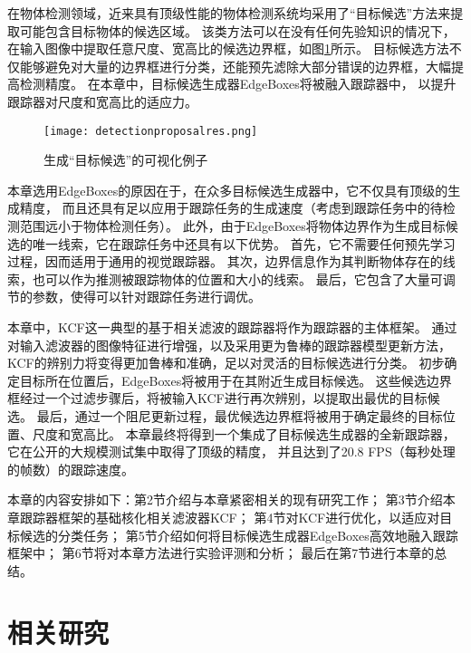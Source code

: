 在物体检测领域，近来具有顶级性能的物体检测系统均采用了``目标候选''方法来提取可能包含目标物体的候选区域。
该类方法可以在没有任何先验知识的情况下，在输入图像中提取任意尺度、宽高比的候选边界框，如图\ref{detectionproposalres}所示。
目标候选方法不仅能够避免对大量的边界框进行分类，还能预先滤除大部分错误的边界框，大幅提高检测精度。
在本章中，目标候选生成器EdgeBoxes将被融入跟踪器中，
以提升跟踪器对尺度和宽高比的适应力。

\begin{figure}[htb]
\centering
\texttt{[image: detectionproposalres.png]}
\caption{生成``目标候选''的可视化例子}
\label{detectionproposalres}
\end{figure}

本章选用EdgeBoxes的原因在于，在众多目标候选生成器中，它不仅具有顶级的生成精度，
而且还具有足以应用于跟踪任务的生成速度（考虑到跟踪任务中的待检测范围远小于物体检测任务）。
此外，由于EdgeBoxes将物体边界作为生成目标候选的唯一线索，它在跟踪任务中还具有以下优势。
首先，它不需要任何预先学习过程，因而适用于通用的视觉跟踪器。
其次，边界信息作为其判断物体存在的线索，也可以作为推测被跟踪物体的位置和大小的线索。
最后，它包含了大量可调节的参数，使得可以针对跟踪任务进行调优。

本章中，KCF这一典型的基于相关滤波的跟踪器将作为跟踪器的主体框架。
通过对输入滤波器的图像特征进行增强，以及采用更为鲁棒的跟踪器模型更新方法，
KCF的辨别力将变得更加鲁棒和准确，足以对灵活的目标候选进行分类。
初步确定目标所在位置后，EdgeBoxes将被用于在其附近生成目标候选。
这些候选边界框经过一个过滤步骤后，将被输入KCF进行再次辨别，以提取出最优的目标候选。
最后，通过一个阻尼更新过程，最优候选边界框将被用于确定最终的目标位置、尺度和宽高比。
本章最终将得到一个集成了目标候选生成器的全新跟踪器，它在公开的大规模测试集中取得了顶级的精度，
并且达到了20.8 FPS（每秒处理的帧数）的跟踪速度。

本章的内容安排如下：第2节介绍与本章紧密相关的现有研究工作；
第3节介绍本章跟踪器框架的基础\pozhehao 核化相关滤波器KCF；
第4节对KCF进行优化，以适应对目标候选的分类任务；
第5节介绍如何将目标候选生成器EdgeBoxes高效地融入跟踪框架中；
第6节将对本章方法进行实验评测和分析；
最后在第7节进行本章的总结。

\section{相关研究}
